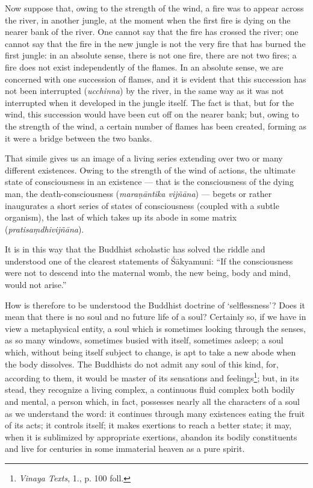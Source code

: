 \documentclass[a4paper, 11pt, oneside, english]{article}
\begin{document}
Now suppose that, owing to the strength of the wind, a fire was to appear across the river, in another jungle, at the moment when the first fire is dying on the nearer bank of the river. One cannot say that the fire has crossed the river; one cannot say that the fire in the new jungle is not the very fire that has burned the first jungle: in an absolute sense, there is not one fire, there are not two fires; a fire does not exist independently of the flames. In an absolute sense, we are concerned with one succession of flames, and it is evident that this succession has not been interrupted (\emph{ucchinna}) by the river, in the same way as it was not interrupted when it developed in the jungle itself. The fact is that, but for the wind, this succession would have been cut off on the nearer bank; but, owing to the strength of the wind, a certain number of flames has been created, forming as it were a bridge between the two banks.

That simile gives us an image of a living series extending over two or many different existences. Owing to the strength of the wind of actions, the ultimate state of consciousness in an existence --- that is the consciousness of the dying man, the death-consciousness (\emph{maraṇāntika vijñāna}) --- begets or rather inaugurates a short series of states of consciousness (coupled with a subtle organism), the last of which takes up its abode in some matrix (\emph{pratisaṃdhivijñāna}).

It is in this way that the Buddhist scholastic has solved the riddle and understood one of the clearest statements of Śākyamuni: ``If the consciousness were not to descend into the maternal womb, the new being, body and mind, would not arise.''

How is therefore to be understood the Buddhist doctrine of `selflessness'? Does it mean that there is no soul and no future life of a soul? Certainly so, if we have in view a metaphysical entity, a soul which is sometimes looking through the senses, as so many windows, sometimes busied with itself, sometimes asleep; a soul which, without being itself subject to change, is apt to take a new abode when the body dissolves. The Buddhists do not admit any soul of this kind, for, according to them, it would be master of its sensations and feelings\footnote{\emph{Vinaya Texts}, 1., p. 100 foll.}; but, in its stead, they recognize a living complex, a continuous fluid complex both bodily and mental, a person which, in fact, possesses nearly all the characters of a soul as we understand the word: it continues through many existences eating the fruit of its acts; it controls itself; it makes exertions to reach a better state; it may, when it is sublimized by appropriate exertions, abandon its bodily constituents and live for centuries in some immaterial heaven as a pure spirit.
\end{document}

